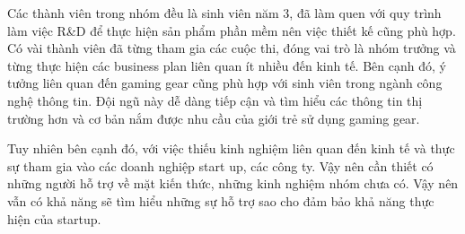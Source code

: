 Các thành viên trong nhóm đều là sinh viên năm 3, đã làm quen với quy trình làm việc R\&D để thực hiện sản phẩm phần mềm nên việc thiết kế cũng phù hợp. Có vài thành viên đã từng tham gia các cuộc thi, đóng vai trò là nhóm trưởng và từng thực hiện các business plan liên quan ít nhiều đến kinh tế. Bên cạnh đó, ý tưởng liên quan đến gaming gear cũng phù hợp với sinh viên trong ngành công nghệ thông tin. Đội ngũ này dễ dàng tiếp cận và tìm hiểu các thông tin thị trường hơn và cơ bản nắm được nhu cầu của giới trẻ sử dụng gaming gear.

Tuy nhiên bên cạnh đó, với việc thiếu kinh nghiệm liên quan đến kinh tế và thực sự tham gia vào các doanh nghiệp start up, các công ty. Vậy nên cần thiết có những người hỗ trợ về mặt kiến thức, những kinh nghiệm nhóm chưa có. Vậy nên vẫn có khả năng sẽ tìm hiểu những sự hỗ trợ sao cho đảm bảo khả năng thực hiện của startup.
